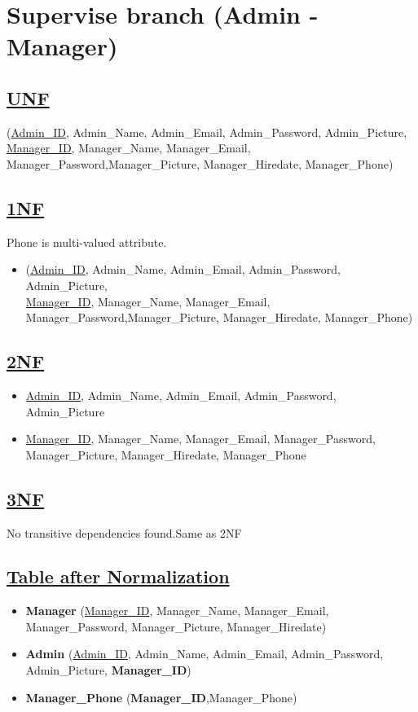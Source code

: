 \section{\texorpdfstring{\centering Supervise branch (Admin - Manager)}{Supervise branch (Admin - Manager)}}
\subsection*{\underline{UNF}}

(\underline{Admin\_ID}, Admin\_Name, Admin\_Email, Admin\_Password, Admin\_Picture,\\
\underline{Manager\_ID}, Manager\_Name, Manager\_Email, Manager\_Password,Manager\_Picture, Manager\_Hiredate, Manager\_Phone)

\subsection*{\underline{1NF}}
Phone is multi-valued attribute.
\vskip 0.2in

\begin{itemize}
    \item (\underline{Admin\_ID}, Admin\_Name, Admin\_Email, Admin\_Password, Admin\_Picture,\\
          \underline{Manager\_ID}, Manager\_Name, Manager\_Email, Manager\_Password,Manager\_Picture, Manager\_Hiredate, Manager\_Phone)
\end{itemize}

\subsection*{\underline{2NF}}
\vskip 0.2in

\begin{itemize}
    \item \underline{Admin\_ID}, Admin\_Name, Admin\_Email, Admin\_Password, Admin\_Picture
    \item \underline{Manager\_ID}, Manager\_Name, Manager\_Email, Manager\_Password, Manager\_Picture, Manager\_Hiredate, Manager\_Phone
\end{itemize}

\subsection*{\underline{3NF}}
No transitive dependencies found.Same as 2NF

\subsection*{\underline{Table after Normalization}}
\vskip 0.2in
\begin{itemize}
    \item \textbf{Manager} (\underline{Manager\_ID}, Manager\_Name, Manager\_Email, Manager\_Password, Manager\_Picture, Manager\_Hiredate)
    \item \textbf{Admin} (\underline{Admin\_ID}, Admin\_Name, Admin\_Email, Admin\_Password, Admin\_Picture, \textbf{Manager\_ID})
    \item \textbf{Manager\_Phone} (\textbf{Manager\_ID},{Manager\_Phone})
\end{itemize}

\clearpage